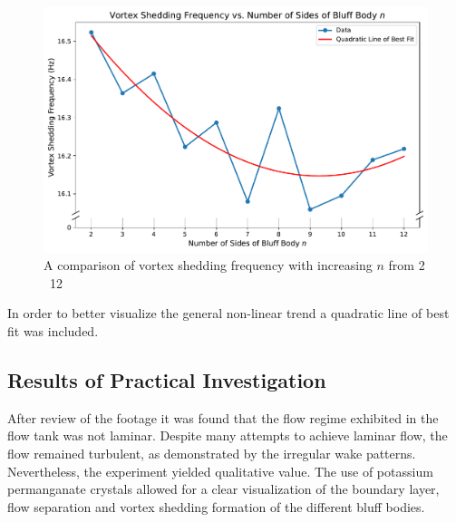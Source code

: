 \begin{figure}[H]
	\centering
	\includegraphics[width=\textwidth]{images/overall}
	\caption{A comparison of vortex shedding frequency with increasing $n$ from 2 \textendash\ 12}
	\label{fig:overall} 
\end{figure}

In order to better visualize the general non-linear trend a quadratic line of best fit was included. 


\subsection{Results of Practical Investigation}
After review of the footage it was found that the flow regime exhibited in the flow tank was not laminar. Despite many attempts to achieve laminar flow, the flow remained turbulent, as demonstrated by the irregular wake patterns. Nevertheless, the experiment yielded qualitative value. The use of potassium permanganate crystals allowed for a clear visualization of the boundary layer, flow separation and vortex shedding formation of the different bluff bodies.


